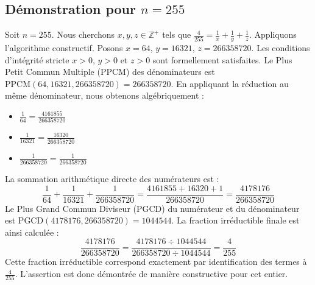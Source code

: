 \documentclass[11pt,a4paper]{article}
\begin{document}
\subsection{Démonstration pour $n = 255$}
Soit $n = 255$. Nous cherchons $x, y, z \in \mathbb{Z}^{+}$ tels que $\frac{4}{255} = \frac{1}{x} + \frac{1}{y} + \frac{1}{z}$.
Appliquons l'algorithme constructif. Posons $x = 64$, $y = 16321$, $z = 266358720$.
Les conditions d'intégrité stricte $x > 0$, $y > 0$ et $z > 0$ sont formellement satisfaites.
Le Plus Petit Commun Multiple (PPCM) des dénominateurs est $\text{PPCM}(64, 16321, 266358720) = 266358720$.
En appliquant la réduction au même dénominateur, nous obtenons algébriquement :
\begin{itemize}
    \item $\frac{1}{64} = \frac{4161855}{266358720}$
    \item $\frac{1}{16321} = \frac{16320}{266358720}$
    \item $\frac{1}{266358720} = \frac{1}{266358720}$
\end{itemize}
La sommation arithmétique directe des numérateurs est :
$$ \frac{1}{64} + \frac{1}{16321} + \frac{1}{266358720} = \frac{4161855 + 16320 + 1}{266358720} = \frac{4178176}{266358720} $$
Le Plus Grand Commun Diviseur (PGCD) du numérateur et du dénominateur est $\text{PGCD}(4178176, 266358720) = 1044544$.
La fraction irréductible finale est ainsi calculée :
$$ \frac{4178176}{266358720} = \frac{4178176 \div 1044544}{266358720 \div 1044544} = \frac{4}{255} $$
Cette fraction irréductible correspond exactement par identification des termes à $\frac{4}{255}$. L'assertion est donc démontrée de manière constructive pour cet entier.
\end{document}

